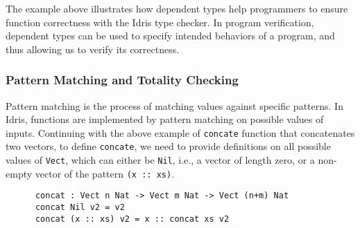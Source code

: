 The  example above illustrates how dependent types help programmers to ensure function correctness with the Idris type checker. In program verification, dependent types can be used to specify intended behaviors of a program, and thus allowing us to verify its correctness. 


\subsubsection*{Pattern Matching and Totality Checking}
Pattern matching is the process of matching values against specific patterns. In Idris, functions are implemented by pattern matching on possible values of inputs. Continuing with the above example of \texttt{concate} function that concatenates two vectors, to define \texttt{concate}, we need to provide definitions on all possible values of \texttt{Vect}, which can either be \texttt{Nil}, i.e., a vector of length zero, or a non-empty vector of the pattern \texttt{(x :: xs)}. 
\begin{lstlisting}
      concat : Vect n Nat -> Vect m Nat -> Vect (n+m) Nat
      concat Nil v2 = v2
      concat (x :: xs) v2 = x :: concat xs v2
\end{lstlisting}

